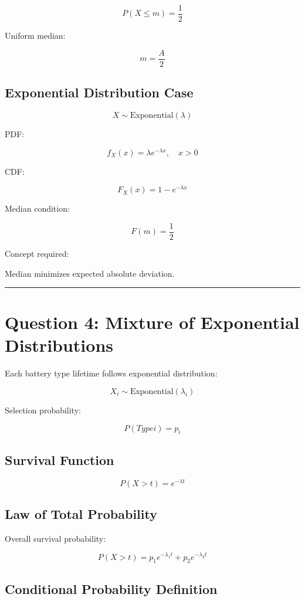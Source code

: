 \documentclass[12pt]{article}
\begin{document}
\[
P(X ≤ m) = \frac{1}{2}
\]

Uniform median:

\[
m = \frac{A}{2}
\]

\subsection*{Exponential Distribution Case}

\[
X \sim \text{Exponential}(\lambda)
\]

PDF:

\[
f_X(x) = \lambda e^{−\lambda x}, \quad x > 0
\]

CDF:

\[
F_X(x) = 1 − e^{−\lambda x}
\]

Median condition:

\[
F(m) = \frac{1}{2}
\]

Concept required:

Median minimizes expected absolute deviation.

\vspace{0.5cm}
\hrule
\vspace{0.5cm}

\section*{Question 4: Mixture of Exponential Distributions}

Each battery type lifetime follows exponential distribution:

\[
X_i \sim \text{Exponential}(\lambda_i)
\]

Selection probability:

\[
P(Type i) = p_i
\]

\subsection*{Survival Function}

\[
P(X > t) = e^{−\lambda t}
\]

\subsection*{Law of Total Probability}

Overall survival probability:

\[
P(X > t)
=
p_1 e^{−\lambda_1 t}
+
p_2 e^{−\lambda_2 t}
\]

\subsection*{Conditional Probability Definition}
\end{document}
